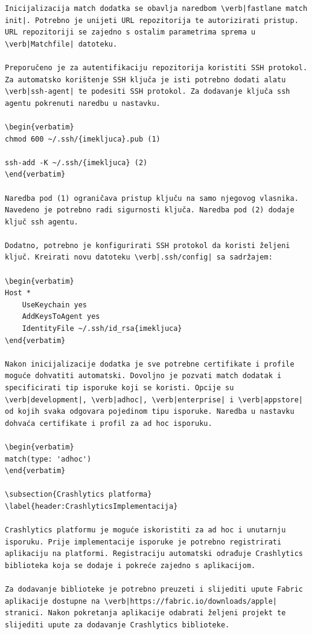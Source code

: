 \documentclass[times, utf8, diplomski, numeric]{fer}
\begin{document}
\begin{appendices}
\begin{lstlisting}[caption=Provjera postojanja i pokretanje Swiftlint alata, label=listing:swiftlint]
Inicijalizacija match dodatka se obavlja naredbom \verb|fastlane match init|. Potrebno je unijeti URL repozitorija te autorizirati pristup. URL repozitoriji se zajedno s ostalim parametrima sprema u \verb|Matchfile| datoteku.

Preporučeno je za autentifikaciju repozitorija koristiti SSH protokol. Za automatsko korištenje SSH ključa je isti potrebno dodati alatu \verb|ssh-agent| te podesiti SSH protokol. Za dodavanje ključa ssh agentu pokrenuti naredbu u nastavku.

\begin{verbatim}
chmod 600 ~/.ssh/{imekljuca}.pub (1)

ssh-add -K ~/.ssh/{imekljuca} (2)
\end{verbatim}

Naredba pod (1) ograničava pristup ključu na samo njegovog vlasnika. Navedeno je potrebno radi sigurnosti ključa. Naredba pod (2) dodaje ključ ssh agentu.

Dodatno, potrebno je konfigurirati SSH protokol da koristi željeni ključ. Kreirati novu datoteku \verb|.ssh/config| sa sadržajem:

\begin{verbatim}
Host *
    UseKeychain yes
    AddKeysToAgent yes
    IdentityFile ~/.ssh/id_rsa{imekljuca}
\end{verbatim}

Nakon inicijalizacije dodatka je sve potrebne certifikate i profile moguće dohvatiti automatski. Dovoljno je pozvati match dodatak i specificirati tip isporuke koji se koristi. Opcije su \verb|development|, \verb|adhoc|, \verb|enterprise| i \verb|appstore| od kojih svaka odgovara pojedinom tipu isporuke. Naredba u nastavku dohvaća certifikate i profil za ad hoc isporuku.

\begin{verbatim}
match(type: 'adhoc')
\end{verbatim}

\subsection{Crashlytics platforma} \label{header:CrashlyticsImplementacija}

Crashlytics platformu je moguće iskoristiti za ad hoc i unutarnju isporuku. Prije implementacije isporuke je potrebno registrirati aplikaciju na platformi. Registraciju automatski odrađuje Crashlytics biblioteka koja se dodaje i pokreće zajedno s aplikacijom.

Za dodavanje biblioteke je potrebno preuzeti i slijediti upute Fabric aplikacije dostupne na \verb|https://fabric.io/downloads/apple| stranici. Nakon pokretanja aplikacije odabrati željeni projekt te slijediti upute za dodavanje Crashlytics biblioteke.


\end{lstlisting}
\end{appendices}
\end{document}
